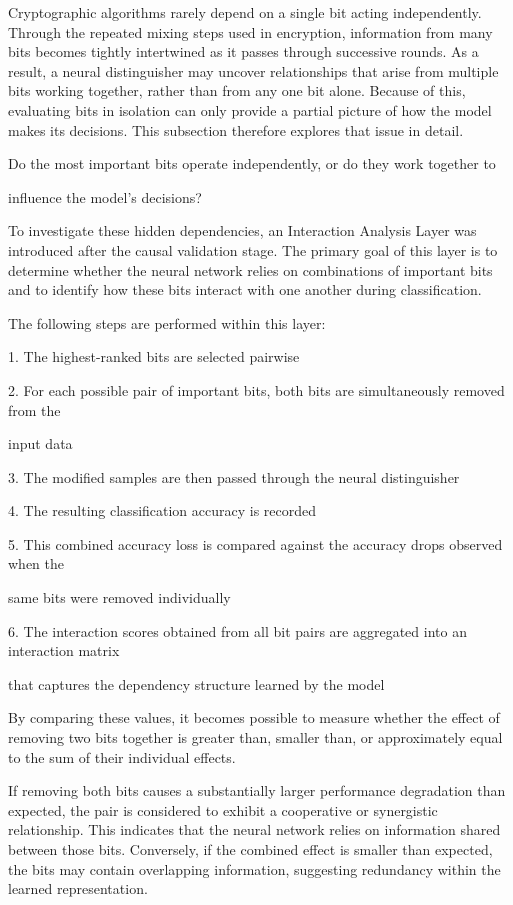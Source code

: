 Cryptographic algorithms rarely depend on a single bit acting independently. Through the 
repeated mixing steps used in encryption, information from many bits becomes tightly 
intertwined as it passes through successive rounds. As a result, a neural distinguisher may 
uncover relationships that arise from multiple bits working together, rather than from any one bit 
alone. Because of this, evaluating bits in isolation can only provide a partial picture of how the 
model makes its decisions. This subsection therefore explores that issue in detail. 

Do the most important bits operate independently, or do they work together to 

influence the model's decisions? 

To investigate these hidden dependencies, an Interaction Analysis Layer was introduced after the 
causal validation stage. The primary goal of this layer is to determine whether the neural network 
relies on combinations of important bits and to identify how these bits interact with one another 
during classification. 

The following steps are performed within this layer: 

1.  The highest-ranked bits are selected pairwise 

2.  For each possible pair of important bits, both bits are simultaneously removed from the 

input data 

3.  The modified samples are then passed through the neural distinguisher 

4.  The resulting classification accuracy is recorded 

5.  This combined accuracy loss is compared against the accuracy drops observed when the 

same bits were removed individually 

6.  The interaction scores obtained from all bit pairs are aggregated into an interaction matrix 

that captures the dependency structure learned by the model 

By comparing these values, it becomes possible to measure whether the effect of removing two 
bits together is greater than, smaller than, or approximately equal to the sum of their individual 
effects.  

If removing both bits causes a substantially larger performance degradation than expected, the 
pair is considered to exhibit a cooperative or synergistic relationship. This indicates that the 
neural network relies on information shared between those bits. Conversely, if the combined 
effect is smaller than expected, the bits may contain overlapping information, suggesting 
redundancy within the learned representation. 



